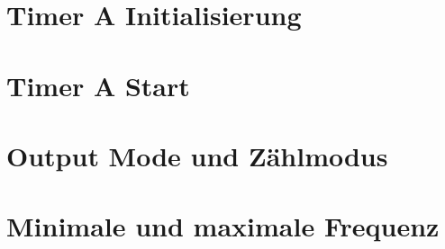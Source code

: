 \documentclass[a4paper, 12pt]{article}
\begin{document}
  
  \clearpage
  \setcounter{page}{1}
  \section{Timer A Initialisierung}

  \section{Timer A Start}

  \section{Output Mode und Zählmodus}

  \section{Minimale und maximale Frequenz}


 
\end{document}
